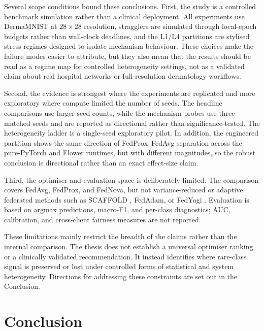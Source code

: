 \documentclass[11pt,a4paper]{report}
\begin{document}
Several scope conditions bound these conclusions. First, the study is a controlled
benchmark simulation rather than a clinical deployment. All experiments use
DermaMNIST at $28 \times 28$ resolution, stragglers are simulated through
local-epoch budgets rather than wall-clock deadlines, and the L1/L4 partitions are
stylised stress regimes designed to isolate mechanism behaviour. These choices make
the failure modes easier to attribute, but they also mean that the results should
be read as a regime map for controlled heterogeneity settings, not as a validated
claim about real hospital networks or full-resolution dermatology workflows.

Second, the evidence is strongest where the experiments are replicated and more
exploratory where compute limited the number of seeds. The headline comparisons use
larger seed counts, while the mechanism probes use three matched seeds and are
reported as directional rather than significance-tested. The heterogeneity ladder is
a single-seed exploratory pilot. In addition, the engineered partition shows the
same direction of FedProx--FedAvg separation across the pure-PyTorch and Flower
runtimes, but with different magnitudes, so the robust conclusion is directional
rather than an exact effect-size claim.

Third, the optimiser and evaluation space is deliberately limited. The comparison
covers FedAvg, FedProx, and FedNova, but not variance-reduced or adaptive federated
methods such as SCAFFOLD \citep{karimireddy2020scaffold}, FedAdam, or FedYogi
\citep{reddi2021adaptive}. Evaluation is based on argmax predictions, macro-F1, and
per-class diagnostics; AUC, calibration, and cross-client fairness measures are not
reported.

These limitations mainly restrict the breadth of the claims rather than the internal
comparison. The thesis does not establish a universal optimiser ranking or a
clinically validated recommendation. It instead identifies where rare-class signal
is preserved or lost under controlled forms of statistical and system heterogeneity.
Directions for addressing these constraints are set out in the Conclusion.

\section{Conclusion}
\label{sec:conc}
\end{document}
